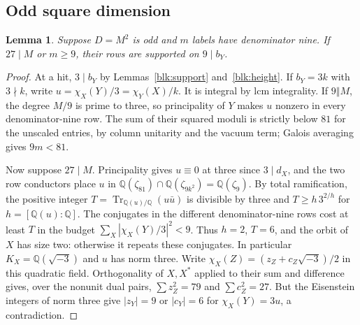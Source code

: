 \documentclass[11pt]{amsart}
\numberwithin{equation}{section}
\newtheorem{lemma}[theorem]{Lemma}
\theoremstyle{definition}
\theoremstyle{plain}
\DeclareMathOperator{\Tr}{Tr}
\newcommand{\QQ}{\mathbb Q}
\begin{document}
\subsection{Odd square dimension}

\begin{lemma}\label{odd:nine-support}
Suppose $D=M^2$ is odd and $m$ labels have denominator nine. If
$27\mid M$ or $m\ge9$, their rows are supported on $9\mid b_Y$.
\end{lemma}
\begin{proof}
At a hit, $3\mid b_Y$ by Lemmas~\ref{blk:support} and~\ref{blk:height}.
If $b_Y=3k$ with $3\nmid k$, write
$u=\chi_X(Y)/3=\chi_Y(X)/k$. It is integral by lcm integrality.
If $9\Vert M$, the degree $M/9$ is prime to three, so principality
of $Y$ makes $u$ nonzero in every denominator-nine row.
The sum of their squared moduli is strictly below $81$ for the
unscaled entries, by column unitarity and the vacuum term;
Galois averaging gives $9m<81$.

Now suppose $27\mid M$. Principality gives $u\equiv0$ at three
since $3\mid d_X$, and the two row conductors place $u$ in
$\QQ(\zeta_{81})\cap\QQ(\zeta_{9k^2})=\QQ(\zeta_9)$.
By total ramification, the positive integer
$T=\Tr_{\QQ(u)/\QQ}(u\bar u)$ is divisible by three and
$T\ge h\,3^{2/h}$ for $h=[\QQ(u):\QQ]$.
The conjugates in the different denominator-nine rows cost at
least $T$ in the budget $\sum_X|\chi_X(Y)/3|^2<9$. Thus $h=2$,
$T=6$, and the orbit of $X$ has size two: otherwise it repeats
these conjugates. In particular $K_X=\QQ(\sqrt{-3})$ and $u$ has
norm three. Write $\chi_X(Z)=(z_Z+c_Z\sqrt{-3})/2$ in this
quadratic field. Orthogonality of $X,X^*$ applied to their sum
and difference gives, over the nonunit dual pairs,
$\sum z_Z^2=79$ and $\sum c_Z^2=27$. But the Eisenstein integers
of norm three give $|z_Y|=9$ or $|c_Y|=6$ for $\chi_X(Y)=3u$,
a contradiction.
\end{proof}
\end{document}
